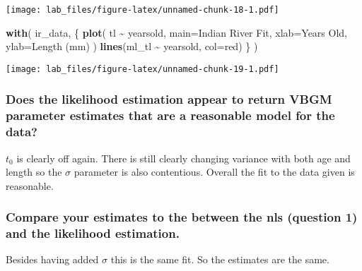 \documentclass[
]{article}
\newenvironment{Shaded}{\begin{snugshade}}{\end{snugshade}}
\newcommand{\DataTypeTok}[1]{\textcolor[rgb]{0.13,0.29,0.53}{#1}}
\newcommand{\KeywordTok}[1]{\textcolor[rgb]{0.13,0.29,0.53}{\textbf{#1}}}
\newcommand{\NormalTok}[1]{#1}
\newcommand{\OperatorTok}[1]{\textcolor[rgb]{0.81,0.36,0.00}{\textbf{#1}}}
\newcommand{\StringTok}[1]{\textcolor[rgb]{0.31,0.60,0.02}{#1}}
\begin{document}
\texttt{[image: lab\_files/figure-latex/unnamed-chunk-18-1.pdf]}

\begin{Shaded}
\begin{Highlighting}[]
\KeywordTok{with}\NormalTok{(}
\NormalTok{  ir\_data, \{}
    \KeywordTok{plot}\NormalTok{(}
\NormalTok{      tl }\OperatorTok{\textasciitilde{}}\StringTok{ }\NormalTok{yearsold,}
      \DataTypeTok{main=}\StringTok{\textquotesingle{}Indian River Fit\textquotesingle{}}\NormalTok{,}
      \DataTypeTok{xlab=}\StringTok{\textquotesingle{}Years Old\textquotesingle{}}\NormalTok{,}
      \DataTypeTok{ylab=}\StringTok{\textquotesingle{}Length (mm)\textquotesingle{}}
\NormalTok{    )}
    \KeywordTok{lines}\NormalTok{(ml\_tl }\OperatorTok{\textasciitilde{}}\StringTok{ }\NormalTok{yearsold, }\DataTypeTok{col=}\StringTok{\textquotesingle{}red\textquotesingle{}}\NormalTok{)}
\NormalTok{  \}}
\NormalTok{)}
\end{Highlighting}
\end{Shaded}

\texttt{[image: lab\_files/figure-latex/unnamed-chunk-19-1.pdf]}

\hypertarget{does-the-likelihood-estimation-appear-to-return-vbgm-parameter-estimates-that-are-a-reasonable-model-for-the-data-1}{%
\subsubsection{Does the likelihood estimation appear to return VBGM
parameter estimates that are a reasonable model for the
data?}\label{does-the-likelihood-estimation-appear-to-return-vbgm-parameter-estimates-that-are-a-reasonable-model-for-the-data-1}}

\(t_0\) is clearly off again. There is still clearly changing variance
with both age and length so the \(\sigma\) parameter is also
contentious. Overall the fit to the data given is reasonable.

\hypertarget{compare-your-estimates-to-the-between-the-nls-question-1-and-the-likelihood-estimation.-1}{%
\subsubsection{Compare your estimates to the between the nls (question
1) and the likelihood
estimation.}\label{compare-your-estimates-to-the-between-the-nls-question-1-and-the-likelihood-estimation.-1}}

Besides having added \(\sigma\) this is the same fit. So the estimates
are the same.
\end{document}
